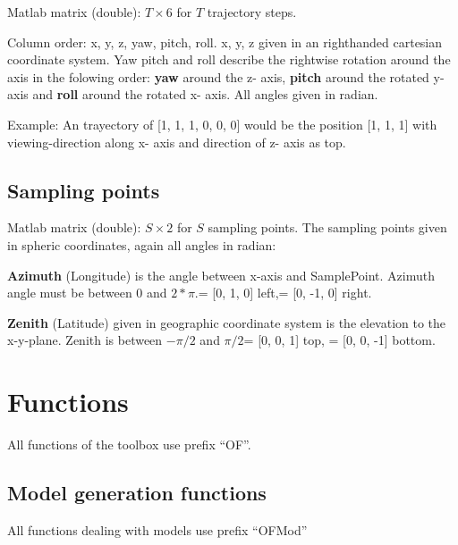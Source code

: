 \documentclass[a4paper]{article}
\begin{document}
Matlab matrix (double): $T \times 6$ for $T$ trajectory steps.

Column order: x, y, z, yaw, pitch, roll.\newline
x, y, z given in an righthanded cartesian coordinate system.
Yaw pitch and roll describe the rightwise rotation around the axis in the folowing order: \newline
\textbf{yaw} around the z- axis,\newline
\textbf{pitch} around the rotated y- axis and\newline
\textbf{roll} around the rotated x- axis.\newline
All angles given in radian.

Example:
An trayectory of [1, 1, 1, 0, 0, 0] would be the position [1, 1, 1] with viewing-direction along x- axis
and direction of z- axis as top.


\subsection{Sampling points}

Matlab matrix (double): $S \times 2$ for $S$ sampling points.
The sampling points given in spheric coordinates, again all angles in radian:\newline

\textbf{Azimuth} (Longitude) is the angle between x-axis and SamplePoint.
Azimuth angle must be between 0 and $2*\pi$.\newline
[$\pi/2$, 0] = [0, 1, 0] left,\newline
[3*$\pi/2$, 0] = [0, -1, 0] right.


\textbf{Zenith} (Latitude) given in geographic coordinate system is the elevation to the x-y-plane.
Zenith is between $-\pi/2$ and $\pi/2$\newline
[0, $\pi/2$] = [0, 0, 1] top, \newline
[0, $-\pi/2$] = [0, 0, -1] bottom.


\section{Functions}

All functions of the toolbox use prefix ``OF''.

\subsection{Model generation functions}

All functions dealing with models use prefix ``OFMod''
\end{document}
